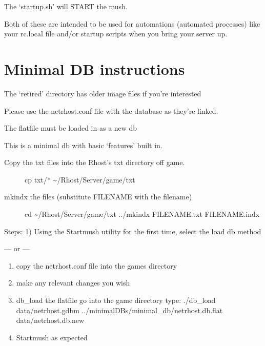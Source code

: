 \documentclass[letterpaper,10pt,english]{sphinxmanual}
\begin{document}
\sphinxAtStartPar
The ‘startup.sh’ will START the mush.

\sphinxAtStartPar
Both of these are intended to be used for automations (automated processes)
like your rc.local file and/or startup scripts when you bring your server up.


\chapter{Minimal DB instructions}
\label{\detokenize{41-minimaldb:minimal-db-instructions}}\label{\detokenize{41-minimaldb::doc}}
\sphinxAtStartPar
The ‘retired’ directory has older image files if you’re interested

\sphinxAtStartPar
Please use the netrhost.conf file with the database as they’re linked.

\sphinxAtStartPar
The flatfile must be loaded in as a new db

\sphinxAtStartPar
This is a minimal db with basic ‘features’ built in.
\begin{description}
\item[{Copy the txt files into the Rhost’s txt directory off game.}] \leavevmode
\sphinxAtStartPar
cp txt/* \textasciitilde{}/Rhost/Server/game/txt

\item[{mkindx the files (substitute FILENAME with the filename)}] \leavevmode
\sphinxAtStartPar
cd \textasciitilde{}/Rhost/Server/game/txt
../mkindx FILENAME.txt FILENAME.indx

\end{description}

\sphinxAtStartPar
Steps:
1) Using the Startmush utility for the first time, select the load db method

\sphinxAtStartPar
— or —
\begin{enumerate}
%
\item {} 
\sphinxAtStartPar
copy the netrhost.conf file into the games directory

\item {} 
\sphinxAtStartPar
make any relevant changes you wish

\item {} 
\sphinxAtStartPar
db\_load the flatfile
\sphinxhyphen{} go into the game directory
\sphinxhyphen{} type: ./db\_load data/netrhost.gdbm ../minimal\sphinxhyphen{}DBs/minimal\_db/netrhost.db.flat data/netrhost.db.new

\item {} 
\sphinxAtStartPar
Startmush as expected

\end{enumerate}
\end{document}
